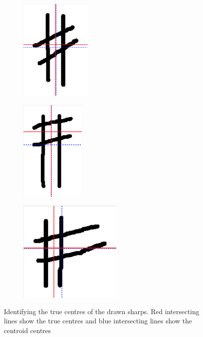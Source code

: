 \begin{figure}[h!]
    \centering
    \begin{subfigure}[b]{.3\linewidth}
        \centering
        \includegraphics[height=5cm]{gfx/techniques/sharp-centroid-6109.png}
    \end{subfigure}
    \begin{subfigure}[b]{.3\linewidth}
        \centering
        \includegraphics[height=5cm]{gfx/techniques/sharp-centroid-6110.png}
    \end{subfigure}
    \begin{subfigure}[b]{.3\linewidth}
        \centering
        \includegraphics[height=5cm]{gfx/techniques/sharp-centroid-6108.png}
    \end{subfigure}

  \caption{Identifying the true centres of the drawn sharps. Red intersecting lines show the true centres and blue intersecting lines show the centroid centres}
  \label{fig:sharp-centroids}
\end{figure}

